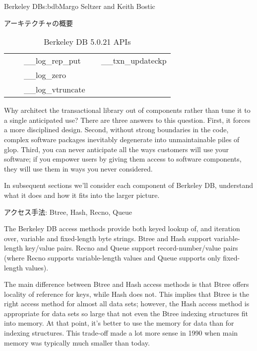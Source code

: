 \begin{aosachapter}{Berkeley DB}{s:bdb}{Margo Seltzer and Keith Bostic}
\begin{aosasect1}{アーキテクチャの概要}
\begin{table}[t]
\begin{tabular}[c] { | l | l | l | l | l | }
              &                & \_\_log\_rep\_put          &                          & \_\_txn\_updateckp \\
              &                & \_\_log\_zero             &                          &  \\
              &                & \_\_log\_vtruncate        &                          &  \\
\hline
\end{tabular}
\caption{Berkeley DB 5.0.21 APIs}
\label{tbl.bdb.apitab}
\end{table}

Why architect the transactional library out of components rather than
tune it to a single anticipated use? There are three answers to this
question. First, it forces a more disciplined design. Second, without
strong boundaries in the code, complex software packages inevitably
degenerate into unmaintainable piles of glop. Third, you can never
anticipate all the ways customers will use your software; if you
empower users by giving them access to software components, they will
use them in ways you never considered.

In subsequent sections we'll consider each component of Berkeley DB,
understand what it does and how it fits into the larger picture.

\end{aosasect1}

\begin{aosasect1}{アクセス手法: Btree, Hash, Recno, Queue}

The Berkeley DB access methods provide both keyed lookup of, and
iteration over, variable and fixed-length byte strings.  Btree and
Hash support variable-length key/value pairs. Recno and Queue support
record-number/value pairs (where Recno supports variable-length values
and Queue supports only fixed-length values).

\pagebreak

The main difference between Btree and Hash access methods is that
Btree offers locality of reference for keys, while Hash does not. This
implies that Btree is the right access method for almost all data sets;
however, the Hash access method is appropriate for data sets so large
that not even the Btree indexing structures fit into memory. At that
point, it's better to use the memory for data than for indexing
structures. This trade-off made a lot more sense in 1990 when main
memory was typically much smaller than today.


\end{aosasect1}
\end{aosachapter}
